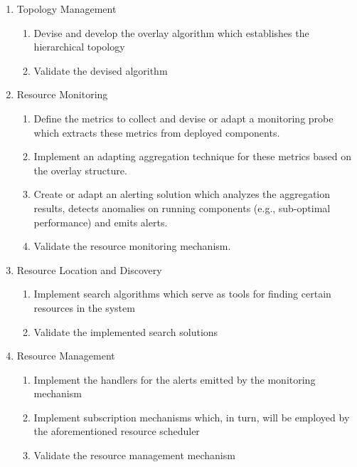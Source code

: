 \begin{enumerate}
    \item Topology Management
    
    \begin{enumerate}
        \item Devise and develop the overlay algorithm which establishes the hierarchical topology
        \item Validate the devised algorithm
    \end{enumerate}
    
    \item Resource Monitoring
    
    \begin{enumerate}
        \item Define the metrics to collect and devise or adapt a monitoring probe which extracts these metrics from deployed components.
        \item Implement an adapting aggregation technique for these metrics based on the overlay structure.
        \item Create or adapt an alerting solution which analyzes the aggregation results, detects anomalies on running components (e.g., sub-optimal performance) and emits alerts.
        \item Validate the resource monitoring mechanism.
    \end{enumerate}
    
    \item Resource Location and Discovery
    
    \begin{enumerate}
        \item Implement search algorithms which serve as tools for finding certain resources in the system
        \item Validate the implemented search solutions
    \end{enumerate}
    
    \item Resource Management
    
    \begin{enumerate}
        \item Implement the handlers for the alerts emitted by the monitoring mechanism
        \item Implement subscription mechanisms which, in turn, will be employed by the aforementioned resource scheduler
        \item Validate the resource management mechanism
    \end{enumerate}


\end{enumerate}
